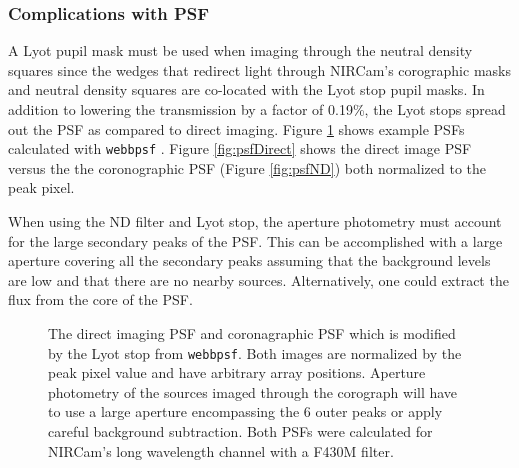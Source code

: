 \documentclass{aastex6}
\begin{document}
\subsubsection{Complications with PSF}
A Lyot pupil mask must be used when imaging through the neutral density squares since the wedges that redirect light through NIRCam's corographic masks and neutral density squares are co-located with the Lyot stop pupil masks.
In addition to lowering the transmission by a factor of 0.19\%, the Lyot stops spread out the PSF as compared to direct imaging.
Figure \ref{fig:psfComparison} shows example PSFs calculated with \texttt{webbpsf} \citep{perrin2012webbpsf}.
Figure \ref{fig:psfDirect} shows the direct image PSF versus the the coronographic PSF (Figure \ref{fig:psfND}) both normalized to the peak pixel.

When using the ND filter and Lyot stop, the aperture photometry must account for the large secondary peaks of the PSF.
This can be accomplished with a large aperture covering all the secondary peaks assuming that the background levels are low and that there are no nearby sources.
Alternatively, one could extract the flux from the core of the PSF.

\begin{figure}
\centering
{}
	\caption{The direct imaging PSF and coronagraphic PSF which is modified by the Lyot stop from \texttt{webbpsf}. Both images are normalized by the peak pixel value and have arbitrary array positions. Aperture photometry of the sources imaged through the corograph will have to use a large aperture encompassing the 6 outer peaks or apply careful background subtraction. Both PSFs were calculated for NIRCam's long wavelength channel with a F430M filter.}
	\label{fig:psfComparison}
\end{figure} 
\end{document}

